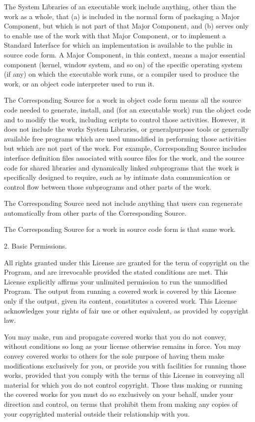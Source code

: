 \documentclass[letterpaper,10pt,english]{sphinxmanual}
\begin{document}
\begin{sphinxVerbatim}[commandchars=\\\{\}]
  The \PYGZdq{}System Libraries\PYGZdq{} of an executable work include anything, other
than the work as a whole, that (a) is included in the normal form of
packaging a Major Component, but which is not part of that Major
Component, and (b) serves only to enable use of the work with that
Major Component, or to implement a Standard Interface for which an
implementation is available to the public in source code form.  A
\PYGZdq{}Major Component\PYGZdq{}, in this context, means a major essential component
(kernel, window system, and so on) of the specific operating system
(if any) on which the executable work runs, or a compiler used to
produce the work, or an object code interpreter used to run it.

  The \PYGZdq{}Corresponding Source\PYGZdq{} for a work in object code form means all
the source code needed to generate, install, and (for an executable
work) run the object code and to modify the work, including scripts to
control those activities.  However, it does not include the work\PYGZsq{}s
System Libraries, or general\PYGZhy{}purpose tools or generally available free
programs which are used unmodified in performing those activities but
which are not part of the work.  For example, Corresponding Source
includes interface definition files associated with source files for
the work, and the source code for shared libraries and dynamically
linked subprograms that the work is specifically designed to require,
such as by intimate data communication or control flow between those
subprograms and other parts of the work.

  The Corresponding Source need not include anything that users
can regenerate automatically from other parts of the Corresponding
Source.

  The Corresponding Source for a work in source code form is that
same work.

  2. Basic Permissions.

  All rights granted under this License are granted for the term of
copyright on the Program, and are irrevocable provided the stated
conditions are met.  This License explicitly affirms your unlimited
permission to run the unmodified Program.  The output from running a
covered work is covered by this License only if the output, given its
content, constitutes a covered work.  This License acknowledges your
rights of fair use or other equivalent, as provided by copyright law.

  You may make, run and propagate covered works that you do not
convey, without conditions so long as your license otherwise remains
in force.  You may convey covered works to others for the sole purpose
of having them make modifications exclusively for you, or provide you
with facilities for running those works, provided that you comply with
the terms of this License in conveying all material for which you do
not control copyright.  Those thus making or running the covered works
for you must do so exclusively on your behalf, under your direction
and control, on terms that prohibit them from making any copies of
your copyrighted material outside their relationship with you.


\end{sphinxVerbatim}
\end{document}
